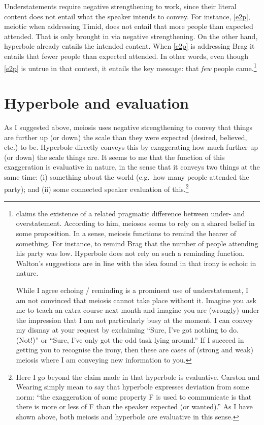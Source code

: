 \documentclass[a4paper,12pt,twoside]{article}
\begin{document}
Understatements require negative strengthening to work, since their literal content does not entail what the speaker intends to convey. For instance, \ref{e2p}, meiotic when addressing Timid, does not entail that more people than expected attended. That is only brought in via negative strengthening. On the other hand, hyperbole already entails the intended content. When \ref{e2p} is addressing Brag it entails that fewer people than expected attended. In other words, even though \ref{e2p} is untrue in that context, it entails the key message: that {\em few} people came.\footnote{\cite{walton_17} claims the existence of a related pragmatic difference between under- and overstatement. According to him, meiosos seems to rely on a shared belief in some proposition. In a sense, meiosis functions to remind the hearer of something. For instance, to remind Brag that the number of people attending his party was low. Hyperbole does not rely on such a reminding function. Walton's suggestions are in line with the idea found in \cite{wilson92} that irony is echoic in nature. 

While I agree echoing / reminding is a prominent use of understatement, I am not convinced that meiosis cannot take place without it. Imagine you ask me to teach an extra course next month and imagine you are (wrongly) under the impression that I am not particularly busy at the moment. I can convey my dismay at your request by exclaiming ``Sure, I've got nothing to do. (Not!)'' or ``Sure, I've only got the odd task lying around.'' If I succeed in getting you to recognise the irony, then these are cases of (strong and weak) meiosis where I am conveying new information to you.}

\section{Hyperbole and evaluation}

As I suggested above, meiosis uses negative strengthening to convey that things are further up (or down) the scale than they were expected (desired, believed, etc.) to be. Hyperbole directly conveys this by exaggerating how much further up (or down) the scale things are. It seems to me that the function of this exaggeration is evaluative in nature, in the sense that it conveys two things at the same time: (i) something about the world (e.g.~how many people attended the party); and (ii) some connected speaker evaluation of this.\footnote{Here I go beyond the claim made in \cite{carston15} that hyperbole is evaluative. Carston and Wearing simply mean to say that hyperbole expresses deviation from some norm: ``the exaggeration of some property F is used to communicate is that there is more or less of F than the speaker expected (or wanted).'' As I have shown above, both meiosis and hyperbole are evaluative in this sense.}
\end{document}
